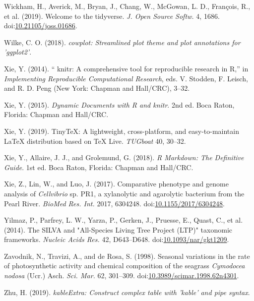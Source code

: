 \documentclass[12pt,]{article}
\begin{document}
\leavevmode\hypertarget{ref-Wickham2019}{}%
Wickham, H., Averick, M., Bryan, J., Chang, W., McGowan, L. D.,
François, R., et al. (2019). Welcome to the tidyverse. \emph{J. Open
Source Softw.} 4, 1686.
doi:\href{https://doi.org/10.21105/joss.01686}{10.21105/joss.01686}.

\leavevmode\hypertarget{ref-Wilke2018}{}%
Wilke, C. O. (2018). \emph{cowplot: Streamlined plot theme and plot
annotations for 'ggplot2'}.

\leavevmode\hypertarget{ref-Xie2014}{}%
Xie, Y. (2014). `` knitr: A comprehensive tool for reproducible research
in R,'' in \emph{Implementing Reproducible Computational Research}, eds.
V. Stodden, F. Leisch, and R. D. Peng (New York: Chapman and Hall/CRC),
3--32.

\leavevmode\hypertarget{ref-Xie2015}{}%
Xie, Y. (2015). \emph{Dynamic Documents with R and knitr}. 2nd ed. Boca
Raton, Florida: Chapman and Hall/CRC.

\leavevmode\hypertarget{ref-Xie2019a}{}%
Xie, Y. (2019). TinyTeX: A lightweight, cross-platform, and
easy-to-maintain LaTeX distribution based on TeX Live. \emph{TUGboat}
40, 30--32.

\leavevmode\hypertarget{ref-Xie2018}{}%
Xie, Y., Allaire, J. J., and Grolemund, G. (2018). \emph{R Markdown: The
Definitive Guide}. 1st ed. Boca Raton, Florida: Chapman and Hall/CRC.

\leavevmode\hypertarget{ref-Xie2017}{}%
Xie, Z., Lin, W., and Luo, J. (2017). Comparative phenotype and genome
analysis of \emph{Cellvibrio} sp. PR1, a xylanolytic and agarolytic
bacterium from the Pearl River. \emph{BioMed Res. Int.} 2017, 6304248.
doi:\href{https://doi.org/10.1155/2017/6304248}{10.1155/2017/6304248}.

\leavevmode\hypertarget{ref-Yilmaz2014}{}%
Yilmaz, P., Parfrey, L. W., Yarza, P., Gerken, J., Pruesse, E., Quast,
C., et al. (2014). The SILVA and "All-Species Living Tree Project (LTP)"
taxonomic frameworks. \emph{Nucleic Acids Res.} 42, D643--D648.
doi:\href{https://doi.org/10.1093/nar/gkt1209}{10.1093/nar/gkt1209}.

\leavevmode\hypertarget{ref-Zavodnik1998}{}%
Zavodnik, N., Travizi, A., and de Rosa, S. (1998). Seasonal variations
in the rate of photosynthetic activity and chemical composition of the
seagrass \emph{Cymodocea nodosa} (Ucr.) Asch. \emph{Sci. Mar.} 62,
301--309.
doi:\href{https://doi.org/10.3989/scimar.1998.62n4301}{10.3989/scimar.1998.62n4301}.

\leavevmode\hypertarget{ref-Zhu2019}{}%
Zhu, H. (2019). \emph{kableExtra: Construct complex table with 'kable'
and pipe syntax}.
\end{document}
